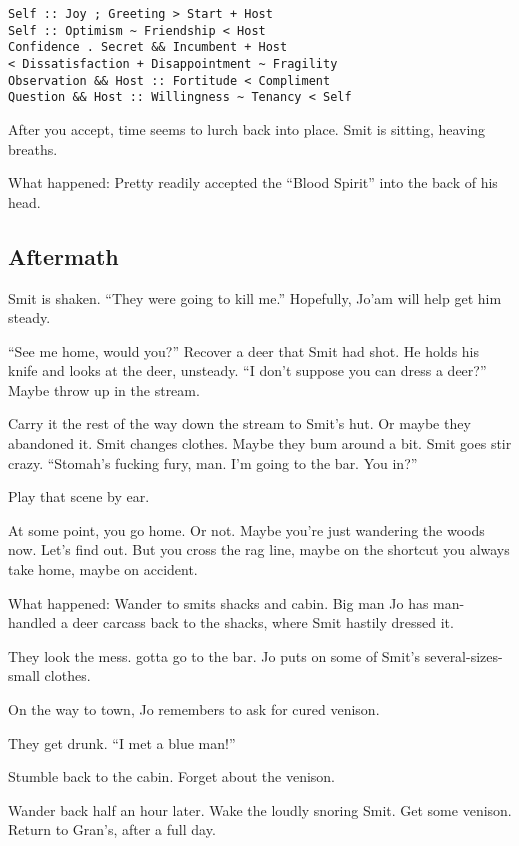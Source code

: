 \begin{multicols}{2}
\begin{verbatim}
Self :: Joy ; Greeting > Start + Host
Self :: Optimism ~ Friendship < Host
Confidence . Secret && Incumbent + Host
< Dissatisfaction + Disappointment ~ Fragility
Observation && Host :: Fortitude < Compliment
Question && Host :: Willingness ~ Tenancy < Self
\end{verbatim}

After you accept, time seems to lurch back into place.
Smit is sitting, heaving breaths.

  \begin{aloud}
  What happened:  Pretty readily accepted the ``Blood Spirit'' into the back of his head.
  \end{aloud}

  \subsection{Aftermath}
Smit is shaken.
``They were going to kill me.''
Hopefully, Jo'am will help get him steady.

``See me home, would you?''
Recover a deer that Smit had shot.
He holds his knife and looks at the deer, unsteady.
``I don't suppose you can dress a deer?''
Maybe throw up in the stream.

Carry it the rest of the way down the stream to Smit's hut.
Or maybe they abandoned it.
Smit changes clothes.
Maybe they bum around a bit.
Smit goes stir crazy.
``Stomah's fucking fury, man.
  I'm going to the bar.
  You in?''

Play that scene by ear.

At some point, you go home.
Or not.
Maybe you're just wandering the woods now.
Let's find out.
But you cross the rag line, maybe on the shortcut you always take home, maybe on accident.

  \begin{aloud}
    What happened:
    Wander to smits shacks and cabin.
    Big man Jo has man-handled a deer carcass back to the shacks, where Smit hastily dressed it.

    They look the mess.
    gotta go to the bar.
    Jo puts on some of Smit's several-sizes-small clothes.

    On the way to town, Jo remembers to ask for cured venison.

    They get drunk.
    ``I met a blue man!''

    Stumble back to the cabin.
    Forget about the venison.

    Wander back half an hour later.
    Wake the loudly snoring Smit.
    Get some venison.
    Return to Gran's, after a full day.
  \end{aloud}


\end{multicols}
